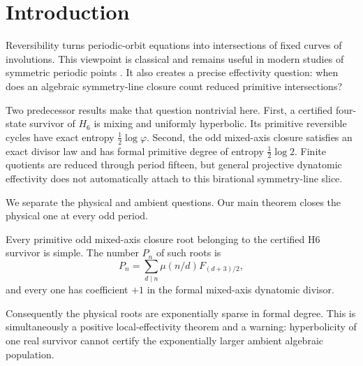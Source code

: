 \section{Introduction}

Reversibility turns periodic-orbit equations into intersections of fixed
curves of involutions.  This viewpoint is classical and remains useful in
modern studies of symmetric periodic points
\citep{Kang2014,YamaguchiTanikawa2005}.  It also creates a precise
effectivity question: when does an algebraic symmetry-line closure count
reduced primitive intersections?

Two predecessor results make that question nontrivial here.  First, a
certified four-state survivor of $H_6$ is mixing and uniformly hyperbolic.
Its primitive reversible cycles have exact entropy $\frac12\log\varphi$.
Second, the odd mixed-axis closure satisfies an exact divisor law and has
formal primitive degree of entropy $\frac12\log2$.  Finite quotients are
reduced through period fifteen, but general projective dynatomic effectivity
\citep{Hutz2010} does not automatically attach to this birational
symmetry-line slice.

We separate the physical and ambient questions.  Our main theorem closes the
physical one at every odd period.

\begin{theorem}\label{thm:main}
Every primitive odd mixed-axis closure root belonging to the certified H6
survivor is simple.  The number $P_n$ of such roots is
\[
P_n=\sum_{d\mid n}\mu(n/d)F_{(d+3)/2},
\]
and every one has coefficient $+1$ in the formal mixed-axis dynatomic
divisor.
\end{theorem}

Consequently the physical roots are exponentially sparse in formal degree.
This is simultaneously a positive local-effectivity theorem and a warning:
hyperbolicity of one real survivor cannot certify the exponentially larger
ambient algebraic population.
